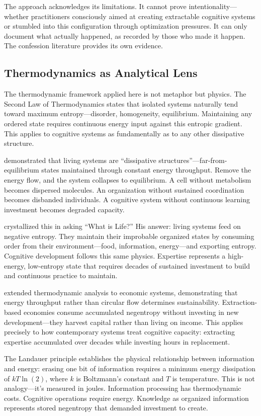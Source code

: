 The approach acknowledges its limitations. It cannot prove intentionality---whether practitioners consciously aimed at creating extractable cognitive systems or stumbled into this configuration through optimization pressures. It can only document what actually happened, as recorded by those who made it happen. The confession literature provides its own evidence.

\subsection{Thermodynamics as Analytical Lens}

The thermodynamic framework applied here is not metaphor but physics. The Second Law of Thermodynamics states that isolated systems naturally tend toward maximum entropy---disorder, homogeneity, equilibrium. Maintaining any ordered state requires continuous energy input against this entropic gradient. This applies to cognitive systems as fundamentally as to any other dissipative structure.

\citet{prigogine1984} demonstrated that living systems are ``dissipative structures''---far-from-equilibrium states maintained through constant energy throughput. Remove the energy flow, and the system collapses to equilibrium. A cell without metabolism becomes dispersed molecules. An organization without sustained coordination becomes disbanded individuals. A cognitive system without continuous learning investment becomes degraded capacity.

\citet{schrodinger1944} crystallized this in asking ``What is Life?'' His answer: living systems feed on negative entropy. They maintain their improbable organized states by consuming order from their environment---food, information, energy---and exporting entropy. Cognitive development follows this same physics. Expertise represents a high-energy, low-entropy state that requires decades of sustained investment to build and continuous practice to maintain.

\citet{georgeschuroegen1971} extended thermodynamic analysis to economic systems, demonstrating that energy throughput rather than circular flow determines sustainability. Extraction-based economies consume accumulated negentropy without investing in new development---they harvest capital rather than living on income. This applies precisely to how contemporary systems treat cognitive capacity: extracting expertise accumulated over decades while investing hours in replacement.

The Landauer principle \citep{landauer1961} establishes the physical relationship between information and energy: erasing one bit of information requires a minimum energy dissipation of $kT \ln(2)$, where $k$ is Boltzmann's constant and $T$ is temperature. This is not analogy---it's measured in joules. Information processing has thermodynamic costs. Cognitive operations require energy. Knowledge as organized information represents stored negentropy that demanded investment to create.

